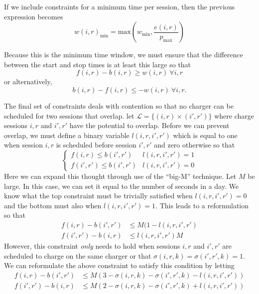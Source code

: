If we include constraints for a minimum time per session, then the previous expression becomes
\begin{equation*}
	w(i,r)_{\text{min}} = \text{max}\left ( w_{\text{min}}, \frac{e(i,r)}{p_\text{max}} \right )
\end{equation*}
\par Because this is the minimum time window, we must ensure that the difference between the start and stop times is at least this large so that
\begin{equation*}
	f(i,r) - b(i,r) \ge w(i,r) \ \forall i,r	
\end{equation*}
or alternatively,
\begin{equation}
	b(i,r) - f(i,r) \le -w(i,r) \ \forall i,r.
\end{equation}
\par The final set of constraints deals with contention so that no charger can be scheduled for two sessions that overlap. let $\mathcal{L} = \{(i,r)\times (i',r') \}$ where charge sessions $i,r$ and $i',r'$ have the potential to overlap. Before we can prevent overlap, we must define a binary variable $l(i,r,i',r')$ which is equal to one when session $i,r$ is scheduled before session $i',r'$ and zero otherwise so that
\begin{equation*}
	\begin{cases}
		f(i,r) \le b(i',r') & l(i,r,i',r') = 1 \\
		f(i',r') \le b(i',r') & l(i,r,i',r') = 0 
	\end{cases}
\end{equation*}
Here we can expand this thought through use of the ``big-M'' technique.  Let $M$ be large. In this case, we can set it equal to the number of seconds in a day. We know what the top constraint must be trivially satisfied when $l(i,r,i',r') = 0$ and the bottom must also when $l(i,r,i',r') = 1$.  This leads to a reformulation so that
\begin{equation*}\begin{aligned}
		f(i,r) - b(i',r') & \le M(1 - l(i,r,i',r')\\
		f(i',r') - b(i,r) & \le l(i,r,i',r')M  
\end{aligned}\end{equation*}
However, this constraint {\it only} needs to hold when sessions $i,r$ and $i',r'$ are scheduled to charge on the same charger or that $\sigma(i,r,k) = \sigma(i',r',k) = 1$. We can reformulate the above constraint to satisfy this condition by letting
\begin{equation}\begin{aligned}
	f(i,r) - b(i',r') & \le M(3 - \sigma(i,r,k) - \sigma(i',r',k) - l(i,r,i',r')) \\
	f(i',r') - b(i,r) & \le M(2 - \sigma(i,r,k) - \sigma(i',r',k) + l(i,r,i',r'))
\end{aligned}\end{equation}
